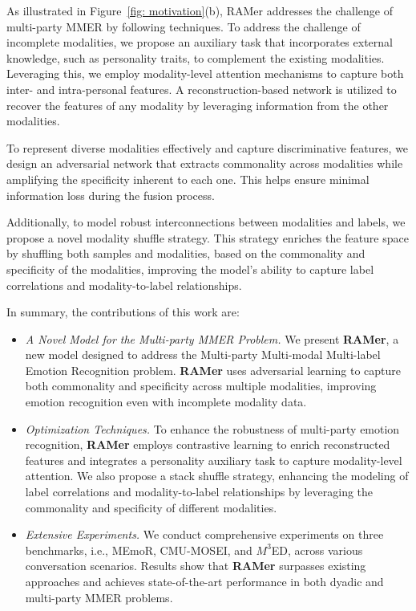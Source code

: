 As illustrated in Figure~\ref{fig: motivation}(b), RAMer addresses the challenge of multi-party MMER by following techniques.
To address the challenge of incomplete modalities, we propose an auxiliary task that incorporates external knowledge, such as personality traits, to complement the existing modalities. Leveraging this, we employ modality-level attention mechanisms to capture both inter- and intra-personal features. A reconstruction-based network is utilized to recover the features of any modality by leveraging information from the other modalities.

To represent diverse modalities effectively and capture discriminative features, we design an adversarial network that extracts commonality across modalities while amplifying the specificity inherent to each one. This helps ensure minimal information loss during the fusion process. 

Additionally, to model robust interconnections between modalities and labels, we propose a novel modality shuffle strategy. This strategy enriches the feature space by shuffling both samples and modalities, based on the commonality and specificity of the modalities, improving the model's ability to capture label correlations and modality-to-label relationships.


In summary, the contributions of this work are:
\begin{itemize}
  \item 
  \textit{A Novel Model for the Multi-party MMER Problem.}
We present \textbf{RAMer}, a new model designed to address the Multi-party Multi-modal Multi-label Emotion Recognition problem. \textbf{RAMer} uses adversarial learning to capture both commonality and specificity across multiple modalities, improving emotion recognition even with incomplete modality data.
  \item \textit{Optimization Techniques.} To enhance the robustness of multi-party emotion recognition, \textbf{RAMer} employs contrastive learning to enrich reconstructed features and integrates a personality auxiliary task to capture modality-level attention. We also propose a stack shuffle strategy, enhancing the modeling of label correlations and modality-to-label relationships by leveraging the commonality and specificity of different modalities.
  \item \textit{Extensive Experiments.} We conduct comprehensive experiments on three benchmarks, i.e., MEmoR, CMU-MOSEI, and $M^3$ED, across various conversation scenarios. Results show that \textbf{RAMer} surpasses existing approaches and achieves state-of-the-art performance in both dyadic and multi-party MMER problems. 
\end{itemize}

